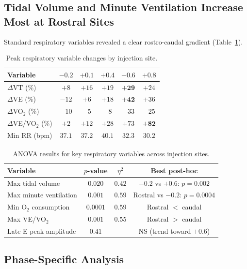 \documentclass[11pt]{article}
\begin{document}
\subsection{Tidal Volume and Minute Ventilation Increase Most at Rostral Sites}

Standard respiratory variables revealed a clear rostro-caudal gradient (Table~\ref{tab:respiratory}).

\begin{table}[H]
\centering
\caption{Peak respiratory variable changes by injection site.}
\label{tab:respiratory}
\begin{tabular}{lccccc}
\toprule
\textbf{Variable} & \textbf{$-0.2$} & \textbf{$+0.1$} & \textbf{$+0.4$} & \textbf{$+0.6$} & \textbf{$+0.8$} \\
\midrule
$\Delta$VT (\%) & $+8$ & $+16$ & $+19$ & $\mathbf{+29}$ & $+24$ \\
$\Delta$VE (\%) & $-12$ & $+6$ & $+18$ & $\mathbf{+42}$ & $+36$ \\
$\Delta$VO$_2$ (\%) & $-10$ & $-5$ & $-8$ & $-33$ & $-25$ \\
$\Delta$VE/VO$_2$ (\%) & $+2$ & $+12$ & $+28$ & $+73$ & $\mathbf{+82}$ \\
Min RR (bpm) & $37.1$ & $37.2$ & $40.1$ & $32.3$ & $30.2$ \\
\bottomrule
\end{tabular}
\end{table}

\begin{table}[H]
\centering
\caption{ANOVA results for key respiratory variables across injection sites.}
\label{tab:anova}
\begin{tabular}{lccc}
\toprule
\textbf{Variable} & \textbf{$p$-value} & \textbf{$\eta^2$} & \textbf{Best post-hoc} \\
\midrule
Max tidal volume & $0.020$ & $0.42$ & $-0.2$ vs $+0.6$: $p=0.002$ \\
Max minute ventilation & $0.001$ & $0.59$ & Rostral vs $-0.2$: $p=0.0004$ \\
Min O$_2$ consumption & $0.0001$ & $0.59$ & Rostral $<$ caudal \\
Max VE/VO$_2$ & $0.001$ & $0.55$ & Rostral $>$ caudal \\
Late-E peak amplitude & $0.41$ & -- & NS (trend toward $+0.6$) \\
\bottomrule
\end{tabular}
\end{table}

\subsection{Phase-Specific Analysis}
\end{document}
